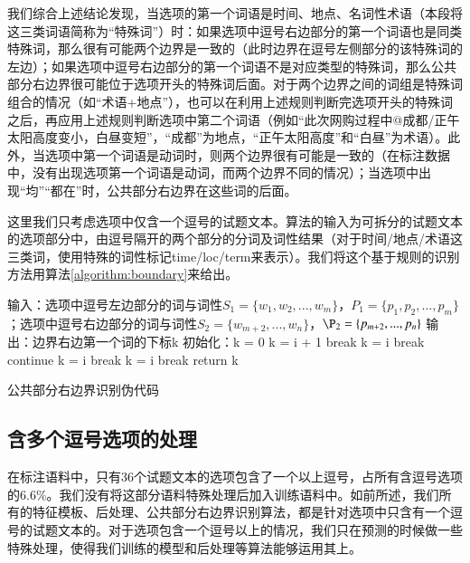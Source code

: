\documentclass[master, winfont]{njuthesis}
\begin{document}
我们综合上述结论发现，当选项的第一个词语是时间、地点、名词性术语（本段将这三类词语简称为“特殊词”）时：如果选项中逗号右边部分的第一个词语也是同类特殊词，那么很有可能两个边界是一致的（此时边界在逗号左侧部分的该特殊词的左边）；如果选项中逗号右边部分的第一个词语不是对应类型的特殊词，那么公共部分右边界很可能位于选项开头的特殊词后面。对于两个边界之间的词组是特殊词组合的情况（如“术语+地点”），也可以在利用上述规则判断完选项开头的特殊词之后，再应用上述规则判断选项中第二个词语（例如“此次网购过程中@成都/正午太阳高度变小，白昼变短”，“成都”为地点，“正午太阳高度”和“白昼”为术语）。此外，当选项中第一个词语是动词时，则两个边界很有可能是一致的（在标注数据中，没有出现选项第一个词语是动词，而两个边界不同的情况）；当选项中出现“均”“都在”时，公共部分右边界在这些词的后面。

这里我们只考虑选项中仅含一个逗号的试题文本。算法的输入为可拆分的试题文本的选项部分中，由逗号隔开的两个部分的分词及词性结果（对于时间/地点/术语这三类词，使用特殊的词性标记time/loc/term来表示）。我们将这个基于规则的识别方法用算法\ref{algorithm:boundary}来给出。

\begin{algorithm}
\begin{algorithmic}[1]
\STATE 输入：选项中逗号左边部分的词与词性$S_1=\{w_1, w_2, ..., w_m\}$，$P_1=\{p_1, p_2, ..., p_m\}$；选项中逗号右边部分的词与词性$S_2=\{w_{m+2}, ..., w_n\}$，$\P_2=\{p_{m+2}, ..., p_n\}$
\STATE 输出：边界右边第一个词的下标k
\STATE 初始化：k = 0
		\STATE k = i + 1
		\STATE break
		\STATE k = i
		\STATE break
		\STATE continue
		\STATE k = i
		\STATE break
	\ELSE
		\STATE k = i
    	\STATE break
    \ENDIF
    \STATE return k
\ENDFOR
\end{algorithmic}
\caption{\label{algorithm:boundary}公共部分右边界识别伪代码}
\end{algorithm}

\subsection{含多个逗号选项的处理}
在标注语料中，只有36个试题文本的选项包含了一个以上逗号，占所有含逗号选项的6.6\%。我们没有将这部分语料特殊处理后加入训练语料中。如前所述，我们所有的特征模板、后处理、公共部分右边界识别算法，都是针对选项中只含有一个逗号的试题文本的。对于选项包含一个逗号以上的情况，我们只在预测的时候做一些特殊处理，使得我们训练的模型和后处理等算法能够运用其上。
\end{document}
